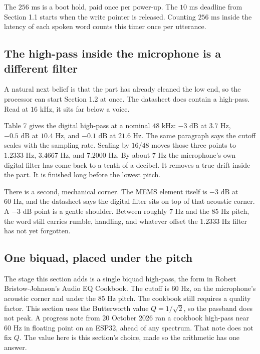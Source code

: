 \documentclass[11pt,a4paper]{article}
\begin{document}
\begin{physicalinsight}
The $256\text{ ms}$ is a boot hold, paid once per power-up. The $10\text{ ms}$ deadline from Section 1.1 starts when the write pointer is released. Counting $256\text{ ms}$ inside the latency of each spoken word counts this timer once per utterance.
\end{physicalinsight}

\subsection*{The high-pass inside the microphone is a different filter}

A natural next belief is that the part has already cleaned the low end, so the processor can start Section 1.2 at once. The datasheet does contain a high-pass. Read at $16\text{ kHz}$, it sits far below a voice.

Table 7 gives the digital high-pass at a nominal $48\text{ kHz}$: $-3\text{ dB}$ at $3.7\text{ Hz}$, $-0.5\text{ dB}$ at $10.4\text{ Hz}$, and $-0.1\text{ dB}$ at $21.6\text{ Hz}$. The same paragraph says the cutoff scales with the sampling rate. Scaling by $16/48$ moves those three points to $1.2333\text{ Hz}$, $3.4667\text{ Hz}$, and $7.2000\text{ Hz}$. By about $7\text{ Hz}$ the microphone's own digital filter has come back to a tenth of a decibel. It removes a true drift inside the part. It is finished long before the lowest pitch.

There is a second, mechanical corner. The MEMS element itself is $-3\text{ dB}$ at $60\text{ Hz}$, and the datasheet says the digital filter sits on top of that acoustic corner. A $-3\text{ dB}$ point is a gentle shoulder. Between roughly $7\text{ Hz}$ and the $85\text{ Hz}$ pitch, the word still carries rumble, handling, and whatever offset the $1.2333\text{ Hz}$ filter has not yet forgotten.

\subsection*{One biquad, placed under the pitch}

The stage this section adds is a single biquad high-pass, the form in Robert Bristow-Johnson's Audio EQ Cookbook. The cutoff is $60\text{ Hz}$, on the microphone's acoustic corner and under the $85\text{ Hz}$ pitch. The cookbook still requires a quality factor. This section uses the Butterworth value $Q = 1/\sqrt{2}$, so the passband does not peak. A progress note from 20 October 2026 ran a cookbook high-pass near $60\text{ Hz}$ in floating point on an ESP32, ahead of any spectrum. That note does not fix $Q$. The value here is this section's choice, made so the arithmetic has one answer.
\end{document}
